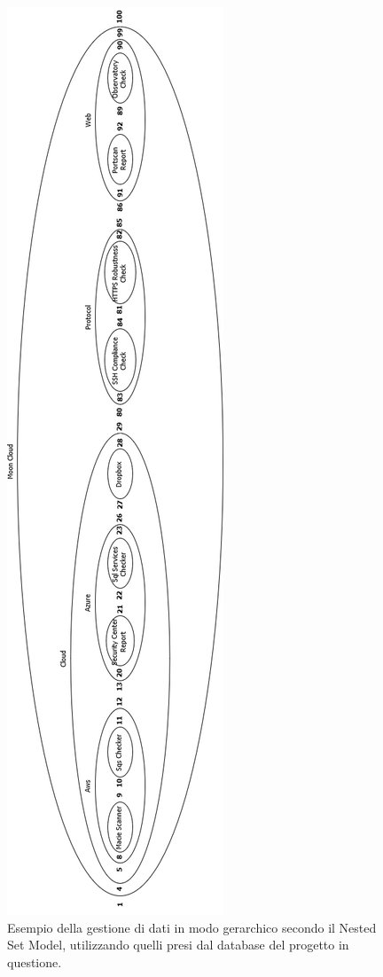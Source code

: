 \begin{figure}
    \centering
    \includegraphics[scale=0.49]{images/MC_Rec_NSM_Container.png}
    \caption{Esempio della gestione di dati in modo gerarchico secondo il Nested Set Model, utilizzando quelli presi dal database del 
    progetto in questione.}
    \label{fig:MC_Rec_NSM_Container}
\end{figure}
%
